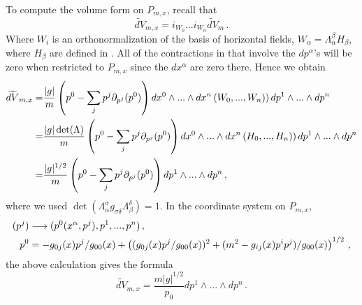 To compute the volume form on $P_{m,x}$, recall  that 
\begin{equation}\label{contractHoriz}
\widetilde{dV}_{m,x}=i_{W_0}...i_{W_n}\widetilde{dV}_m\,.
\end{equation}
Where $W_i$ is an orthonormalization of the basis of horizontal fields, $W_\alpha=\Lambda^\beta_\alpha H_\beta$, where $H_\beta$ are defined in . All of the contractions in  that involve the $dp^\alpha$'s will be zero when restricted to $P_{m,x}$ since the $dx^\alpha$ are zero there. Hence we obtain
\begin{align}\label{dVx}
\widetilde{dV}_{m,x}=&\frac{|g|}{m}\left(p^0-\sum_{j}p^j \partial_{p^j}(p^0) \right)dx^0\wedge...\wedge dx^n\left(W_0,...,W_n)\right) dp^1\wedge...\wedge dp^n\\
=&\frac{|g|\det(\Lambda)}{m}\left(p^0-\sum_{j}p^j \partial_{p^j}(p^0) \right)dx^0\wedge...\wedge dx^n\left(H_0,...,H_n)\right) dp^1\wedge...\wedge dp^n\notag\\
=&\frac{|g|^{1/2}}{m}\left(p^0-\sum_{j}p^j \partial_{p^j}(p^0) \right) dp^1\wedge...\wedge dp^n\,,\notag
\end{align}
where we used $\det(\Lambda^\sigma_\alpha g_{\sigma\delta}\Lambda^\delta_\beta)=1$.
 In the coordinate system on $P_{m,x}$,
\begin{align}
(p^j)&\longrightarrow (p^0(x^\alpha,p^j),p^1,...,p^n)\,,\\
 p^0&=-g_{0j}(x)p^j/g_{00}(x)+\left((g_{0j}(x)p^j/g_{00}(x))^2+(m^2-g_{ij}(x)p^ip^j)/g_{00}(x)\right)^{1/2}\,,\notag
\end{align}
the above calculation   gives the formula
\begin{equation}
\widetilde{dV}_{m,x}=\frac{m|g|^{1/2}}{p_0}dp^1\wedge...\wedge dp^n\,.
\end{equation}



